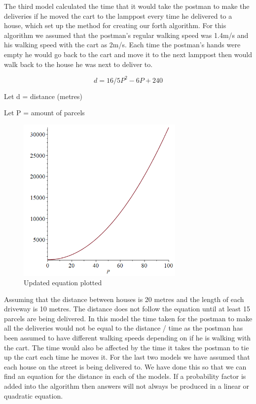 \documentclass[14pt]{article}
\begin{document}
The third model calculated the time that it would take the postman to make the deliveries if he moved the cart to the lamppost every time he delivered to a house, which set up the method for creating our forth algorithm. For this algorithm we assumed that the postman’s regular walking speed was 1.4m/s and his walking speed with the cart as 2m/s. Each time the postman’s hands were empty he would go back to the cart and move it to the next lamppost then would walk back to the house he was next to deliver to.

\begin{equation}
d = 16/5 P^2 - 6P + 240    
\end{equation}

Let d = distance (metres)

Let P = amount of parcels

\begin{figure}[H]
\centering
\includegraphics[width = 230pt]{Images/graph.png}
\caption{Updated equation plotted}
\label{fig:equation 3 plot}
\end{figure}

Assuming that the distance between houses is 20 metres and the length of each driveway is 10 metres. The distance does not follow the equation until at least 15 parcels are being delivered.
In this model the time taken for the postman to make all the deliveries would not be equal to the distance / time as the postman has been assumed to have different walking speeds depending on if he is walking with the cart. The time would also be affected by the time it takes the postman to tie up the cart each time he moves it.
For the last two models we have assumed that each house on the street is being delivered to. We have done this so that we can find an equation for the distance in each of the models. If a probability factor is added into the algorithm then answers will not always be produced in a linear or quadratic equation.
 
\end{document}
